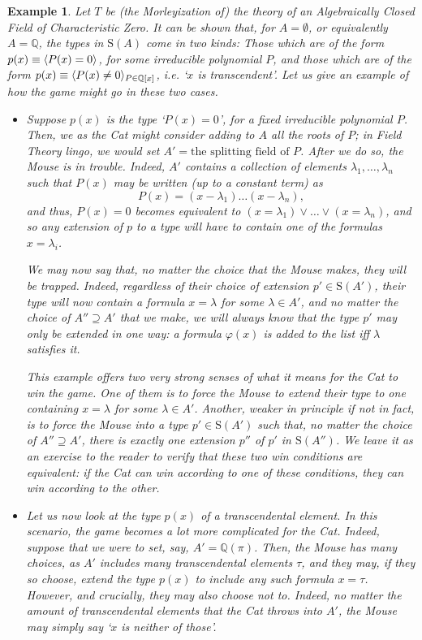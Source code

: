 \documentclass{article}
\newtheorem{example}[theorem]{Example}
\theoremstyle{nonumberplain}
\newcommand{\Q}{\mathbb{Q}}
\newcommand{\Stone}{\mathrm{S}}
\DeclarePairedDelimiter{\braket}{\langle}{\rangle}
\begin{document}
\begin{example}\label{ex:field}
Let $T$ be (the Morleyization of) the theory of an Algebraically Closed Field of Characteristic Zero. It can be shown that, for $A = \emptyset$, or equivalently $A = \Q$, the types in $\Stone(A)$ come in two kinds: Those which are of the form $p(x) \equiv \braket{P(x) = 0}$, for some irreducible polynomial $P$, and those which are of the form $p(x) \equiv \braket{P(x) \neq 0}_{P \in \Q[x]}$, i.e. `$x$ is transcendent'. Let us give an example of how the game might go in these two cases.
\begin{itemize}
\item Suppose $p(x)$ is the type `$P(x) = 0$', for a fixed irreducible polynomial $P$. Then, we as the Cat might consider adding to $A$ all the roots of $P$; in Field Theory lingo, we would set $A' = \text{the splitting field of $P$}$. After we do so, the Mouse is in trouble. Indeed, $A'$ contains a collection of elements $\lambda_1, \dots, \lambda_n$ such that $P(x)$ may be written (up to a constant term) as
\begin{equation}
P(x) = (x - \lambda_1)\dots(x - \lambda_n),
\end{equation}
and thus, $P(x) = 0$ becomes equivalent to $(x = \lambda_1) \lor \dots \lor (x = \lambda_n)$, and so any extension of $p$ to a type will have to contain one of the formulas $x = \lambda_i$.

We may now say that, no matter the choice that the Mouse makes, they will be trapped. Indeed, regardless of their choice of extension $p' \in \Stone(A')$, their type will now contain a formula $x = \lambda$ for some $\lambda \in A'$, and no matter the choice of $A'' \supseteq A'$ that we make, we will always know that the type $p'$ may only be extended in one way: a formula $\varphi(x)$ is added to the list iff $\lambda$ satisfies it.

This example offers two very strong senses of what it means for the Cat to win the game. One of them is to force the Mouse to extend their type to one containing $x = \lambda$ for some $\lambda \in A'$. Another, weaker in principle if not in fact, is to force the Mouse into a type $p' \in \Stone(A')$ such that, no matter the choice of $A'' \supseteq A'$, there is exactly one extension $p''$ of $p'$ in $\Stone(A'')$. We leave it as an exercise to the reader to verify that these two win conditions are equivalent: if the Cat can win according to one of these conditions, they can win according to the other.

\item Let us now look at the type $p(x)$ of a transcendental element. In this scenario, the game becomes a lot more complicated for the Cat. Indeed, suppose that we were to set, say, $A' = \Q(\pi)$. Then, the Mouse has many choices, as $A'$ includes many transcendental elements $\tau$, and they may, if they so choose, extend the type $p(x)$ to include any such formula $x = \tau$. However, and crucially, they may also choose not to. Indeed, no matter the amount of transcendental elements that the Cat throws into $A'$, the Mouse may simply say `$x$ is neither of those'.


\end{itemize}
\end{example}
\end{document}

